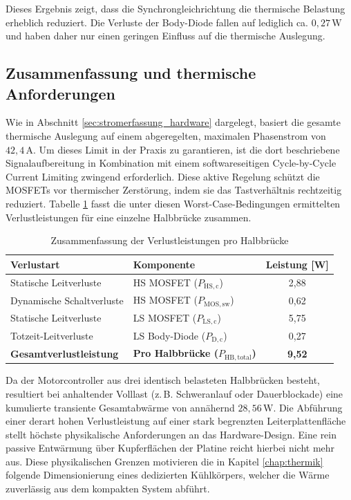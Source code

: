 Dieses Ergebnis zeigt, dass die Synchrongleichrichtung die thermische Belastung erheblich reduziert. Die Verluste der Body-Diode fallen auf lediglich ca. $0{,}27\,\mathrm{W}$ und haben daher nur einen geringen Einfluss auf die thermische Auslegung.

\subsection{Zusammenfassung und thermische Anforderungen}

Wie in Abschnitt \ref{sec:stromerfassung_hardware} dargelegt, basiert die gesamte thermische Auslegung auf einem abgeregelten, maximalen Phasenstrom von $42{,}4\,\mathrm{A}$. Um dieses Limit in der Praxis zu garantieren, ist die dort beschriebene Signalaufbereitung in Kombination mit einem softwareseitigen Cycle-by-Cycle Current Limiting zwingend erforderlich. Diese aktive Regelung schützt die MOSFETs vor thermischer Zerstörung, indem sie das Tastverhältnis rechtzeitig reduziert. 
Tabelle \ref{tab:loss_summary} fasst die unter diesen Worst-Case-Bedingungen ermittelten Verlustleistungen für eine einzelne Halbbrücke zusammen.

\begin{table}[htbp]
    \centering
    \caption{Zusammenfassung der Verlustleistungen pro Halbbrücke}
    \label{tab:loss_summary}
    \begin{tabular}{llc}
        \toprule
        \textbf{Verlustart} & \textbf{Komponente} & \textbf{Leistung [W]} \\
        \midrule
        Statische Leitverluste & HS MOSFET ($P_{\mathrm{HS,c}}$) & 2,88 \\
        Dynamische Schaltverluste & HS MOSFET ($P_{\mathrm{MOS,sw}}$) & 0,62 \\
        Statische Leitverluste & LS MOSFET ($P_{\mathrm{LS,c}}$) & 5,75 \\
        Totzeit-Leitverluste & LS Body-Diode ($P_{\mathrm{D,c}}$) & 0,27 \\
        \midrule
        \textbf{Gesamtverlustleistung} & \textbf{Pro Halbbrücke ($P_{\mathrm{HB,total}}$)} & \textbf{9,52} \\
        \bottomrule
    \end{tabular}
\end{table}

Da der Motorcontroller aus drei identisch belasteten Halbbrücken besteht, resultiert bei anhaltender Volllast (z.\,B. Schweranlauf oder Dauerblockade) eine kumulierte transiente Gesamtabwärme von annähernd $28{,}56\,\mathrm{W}$. Die Abführung einer derart hohen Verlustleistung auf einer stark begrenzten Leiterplattenfläche stellt höchste physikalische Anforderungen an das Hardware-Design. Eine rein passive Entwärmung über Kupferflächen der Platine reicht hierbei nicht mehr aus. Diese physikalischen Grenzen motivieren die in Kapitel \ref{chap:thermik} folgende Dimensionierung eines dedizierten Kühlkörpers, welcher die Wärme zuverlässig aus dem kompakten System abführt.

